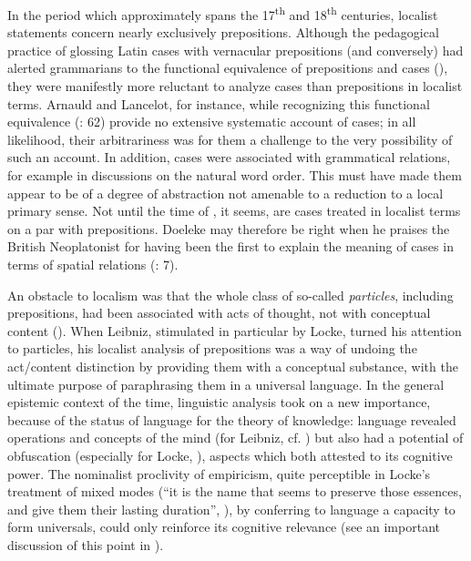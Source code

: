 \documentclass[output=paper]{langscibook}
\begin{document}
In the period which approximately spans the 17\textsuperscript{th} and 18\textsuperscript{th} centuries, localist statements concern nearly exclusively prepositions. Although the pedagogical practice of glossing Latin cases with vernacular prepositions (and conversely) had alerted grammarians to the functional equivalence of prepositions and cases (\citealt[26]{ColombatEtAl2010}), they were manifestly more reluctant to analyze cases than prepositions in localist terms. Arnauld and Lancelot, for instance, while recognizing this functional equivalence (\citealt{arnauld_grammaire_1969}: 62) provide no extensive systematic account of cases; in all likelihood, their arbitrariness was for them a challenge to the very possibility of such an account. In addition, cases were associated with grammatical relations, for example in discussions on the natural word order. This must have made them appear to be of a degree of abstraction not amenable to a reduction to a local primary sense. Not until the time of \citet{harris_hermes_1773}, it seems, are cases treated in localist terms on a par with prepositions. Doeleke may therefore be right when he praises the British Neoplatonist for having been the first to explain the meaning of cases in terms of spatial relations (\citeyear{doeleke_versuche_1814}: 7).

An obstacle to localism was that the whole class of so-called \textit{particles}, including prepositions, had been associated with acts of thought, not with conceptual content (\citealt{nuchelmans_historical_1986}). When Leibniz, stimulated in particular by Locke, turned his attention to particles, his localist analysis of prepositions was a way of undoing the act\slash content distinction by providing them with a conceptual substance, with the ultimate purpose of paraphrasing them in a universal language. In the general epistemic context of the time, linguistic analysis took on a new importance, because of the status of language for the theory of knowledge: language revealed operations and concepts of the mind (for Leibniz, cf. \citealt{dascal_leibniz_1990}) but also had a potential of obfuscation (especially for Locke, \citealt{dawson_locke_2007}), aspects which both attested to its cognitive power. The nominalist proclivity of empiricism, quite perceptible in Locke’s treatment of mixed modes (“it is the name that seems to preserve those essences, and give them their lasting duration”, \citealt[434]{LockeHumanUnderstanding}), by conferring to language a capacity to form universals, could only reinforce its cognitive relevance (see an important discussion of this point in \citealt{formigari_language_1988}).
\end{document}
